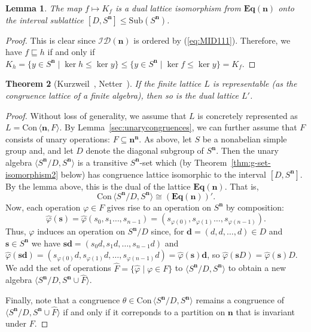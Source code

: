 \documentclass[cm,dissertation,actual,final]{uhthesis}
\theoremstyle{plain}
\newtheorem{theorem}{Theorem}[section]
\newtheorem{lemma}[theorem]{Lemma}
\theoremstyle{definition}
\theoremstyle{remark}
\numberwithin{theorem}{section}
\numberwithin{claim}{chapter}
\numberwithin{equation}{section}
\numberwithin{conjecture}{chapter}
\newcommand{\<}{\ensuremath{\langle}}
\renewcommand{\>}{\ensuremath{\rangle}}
\renewcommand{\leq}{\ensuremath{\leqslant}}
\newcommand{\ID}[1]{\ensuremath{\mathcal{ID}(#1)}}
\newcommand{\bEq}{\ensuremath{\mathbf{Eq}}}
\newcommand{\Con}{\ensuremath{\mathrm{Con\,}}}
\newcommand{\Sub}{\ensuremath{\mathrm{Sub}}}
\newcommand{\0}{\ensuremath{\mathbf{0}}}
\newcommand{\1}{\ensuremath{\mathbf{1}}}
\newcommand{\2}{\ensuremath{\mathbf{2}}}
\newcommand{\3}{\ensuremath{\mathbf{3}}}
\newcommand{\4}{\ensuremath{\mathbf{4}}}
\newcommand{\5}{\ensuremath{\mathbf{5}}}
\newcommand{\bd}{\ensuremath{\mathbf{d}}}
\newcommand{\bn}{\ensuremath{\mathbf{n}}}
\newcommand{\bs}{\ensuremath{\mathbf{s}}}
\renewcommand{\phi}{\ensuremath{\varphi}}
\begin{document}
\begin{lemma}
  The map $f \mapsto K_f$ is a dual lattice isomorphism from $\bEq(\bn)$ onto the
  interval sublattice $[D, S^\bn] \leq \Sub(S^\bn)$.
\end{lemma}
\begin{proof}
This is clear since $\ID{\bn}$ is ordered by (\ref{eq:MID111}).
Therefore, we have 
$f\sqsubseteq h$ if and only if
$K_h = \{y \in S^\bn \mid \ker h \leq \ker y \}
\leq \{y \in S^\bn \mid \ker f \leq \ker y \} =  K_f$.
\end{proof}

%
\begin{theorem}[Kurzweil~\cite{Kurzweil:1985}, Netter~\cite{Netter:1986}]
\label{thm:duals-interv-subl}
  If the finite lattice $L$ is representable (as the congruence lattice of a
  finite algebra), then so is the dual lattice $L'$.
\end{theorem}
\begin{proof}
  Without loss of generality, we assume that $L$ is concretely represented
  as $L = \Con \<\bn, F\>$.
  By Lemma~\ref{sec:unarycongruences},  we can further
  assume that $F$ consists of unary operations: $F \subseteq \bn^\bn$.
  As above, let $S$ be a nonabelian simple group and, 
  and let $D$ denote the diagonal subgroup of $S^\bn$.
  Then the unary algebra $\<S^\bn/D, S^\bn\>$  is a transitive $S^\bn$-set which (by
  Theorem~\ref{thm:g-set-isomorphism2} below) has congruence lattice isomorphic
  to the interval $[D, S^\bn]$.  By the lemma above, this is the dual of the
  lattice $\bEq(\bn)$.  That is, 
  \[
  \Con \<S^\bn/D, S^\bn\> \cong (\bEq(\bn))'.
  \]
  Now, each operation $\phi \in F$ gives rise to an operation on $S^\bn$
  by composition:
  \[
  \hat{\phi}(\bs) = \hat{\phi}(s_{0}, s_1  \dots, s_{n-1}) = (s_{\phi(0)},
  s_{\phi(1)}\dots, s_{\phi(n-1)}). 
  \]
  Thus, $\phi$ induces  an operation on $S^\bn/D$ since, for 
  $\bd = (d, d, \dots, d) \in D$ and $\bs \in S^\bn$ we have 
  $\bs \bd = (s_{0}d, s_{1}d, \dots , s_{n-1}d)$ and 
  $\hat{\phi}(\bs \bd) = (s_{\phi(0)}d, s_{\phi(1)}d, \dots , s_{\phi(n-1)}d) = \hat{\phi}(\bs) \bd$,
  so $\hat{\phi}(\bs D)  = \hat{\phi}(\bs) D$.  We add the set of operations 
  $\hat{F} = \{\hat{\phi} \mid \phi \in F\}$ to $\<S^\bn/D, S^\bn\>$ to obtain
  a new algebra  $\<S^\bn/D, S^\bn \cup \hat{F}\>$.  

  Finally, note 
  that a congruence $\theta \in \Con\<S^\bn/D, S^\bn\>$ remains a congruence of
  $\<S^\bn/D, S^\bn \cup \hat{F}\>$ if and only if it correponds to a partition on
  $\bn$ that is invariant under $F$.
\end{proof}
\end{document}
